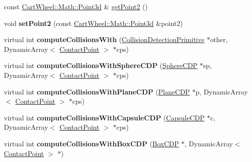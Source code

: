 \begin{DoxyCompactItemize}
\item 
const \hyperlink{classCartWheel_1_1Math_1_1Point3d}{CartWheel::Math::Point3d} \& \hyperlink{classCartWheel_1_1Physics_1_1CapsuleCDP_a76b9615f66c3b48845eb4827bdae25bd}{getPoint2} ()
\item 
\hypertarget{classCartWheel_1_1Physics_1_1CapsuleCDP_a1727423323a5174d29fca263f94b5d02}{
void {\bfseries setPoint2} (const \hyperlink{classCartWheel_1_1Math_1_1Point3d}{CartWheel::Math::Point3d} \&point2)}
\label{classCartWheel_1_1Physics_1_1CapsuleCDP_a1727423323a5174d29fca263f94b5d02}

\item 
\hypertarget{classCartWheel_1_1Physics_1_1CapsuleCDP_aed603f4f9a5169dd84a747a8b6d7cd36}{
virtual int {\bfseries computeCollisionsWith} (\hyperlink{classCartWheel_1_1Physics_1_1CollisionDetectionPrimitive}{CollisionDetectionPrimitive} $\ast$other, DynamicArray$<$ \hyperlink{classCartWheel_1_1Physics_1_1ContactPoint}{ContactPoint} $>$ $\ast$cps)}
\label{classCartWheel_1_1Physics_1_1CapsuleCDP_aed603f4f9a5169dd84a747a8b6d7cd36}

\item 
\hypertarget{classCartWheel_1_1Physics_1_1CapsuleCDP_a2a17f2f54a51c095216a5d3059481695}{
virtual int {\bfseries computeCollisionsWithSphereCDP} (\hyperlink{classCartWheel_1_1Physics_1_1SphereCDP}{SphereCDP} $\ast$sp, DynamicArray$<$ \hyperlink{classCartWheel_1_1Physics_1_1ContactPoint}{ContactPoint} $>$ $\ast$cps)}
\label{classCartWheel_1_1Physics_1_1CapsuleCDP_a2a17f2f54a51c095216a5d3059481695}

\item 
\hypertarget{classCartWheel_1_1Physics_1_1CapsuleCDP_a013edd235e04ceb059d54430e527ad51}{
virtual int {\bfseries computeCollisionsWithPlaneCDP} (\hyperlink{classCartWheel_1_1Physics_1_1PlaneCDP}{PlaneCDP} $\ast$p, DynamicArray$<$ \hyperlink{classCartWheel_1_1Physics_1_1ContactPoint}{ContactPoint} $>$ $\ast$cps)}
\label{classCartWheel_1_1Physics_1_1CapsuleCDP_a013edd235e04ceb059d54430e527ad51}

\item 
\hypertarget{classCartWheel_1_1Physics_1_1CapsuleCDP_a3f618cba19ad8f7b0ed99815eb74c8db}{
virtual int {\bfseries computeCollisionsWithCapsuleCDP} (\hyperlink{classCartWheel_1_1Physics_1_1CapsuleCDP}{CapsuleCDP} $\ast$c, DynamicArray$<$ \hyperlink{classCartWheel_1_1Physics_1_1ContactPoint}{ContactPoint} $>$ $\ast$cps)}
\label{classCartWheel_1_1Physics_1_1CapsuleCDP_a3f618cba19ad8f7b0ed99815eb74c8db}

\item 
\hypertarget{classCartWheel_1_1Physics_1_1CapsuleCDP_abb1b102f25201c5a73d7052c9b15ae96}{
virtual int {\bfseries computeCollisionsWithBoxCDP} (\hyperlink{classCartWheel_1_1Physics_1_1BoxCDP}{BoxCDP} $\ast$, DynamicArray$<$ \hyperlink{classCartWheel_1_1Physics_1_1ContactPoint}{ContactPoint} $>$ $\ast$)}
\label{classCartWheel_1_1Physics_1_1CapsuleCDP_abb1b102f25201c5a73d7052c9b15ae96}

\end{DoxyCompactItemize}
